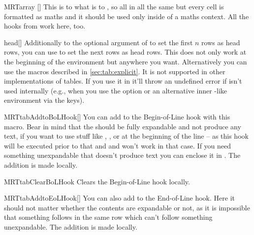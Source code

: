 \begin{describeenv}{MRTarray}%
  []
  This is to  what  is to , so all in
  all the same but every cell is formatted as maths and it should be used only
  inside of a maths context. All the hooks from  work here, too.
\end{describeenv}%

\begin{describemacro}{head}[]%
  Additionally to the optional argument of  to set the first $n$
  rows as head rows, you can use  to set the next  rows as
  head rows. This does not only work at the beginning of the environment but
  anywhere you want. Alternatively you can use the macros described in
  \autoref{sec:tab:explicit}. It is not supported in other implementations of
  tables. If you use it in  it'll throw an undefined error if
   isn't used internally (e.g., when you use the
   option or an alternative inner -like environment via
  the  keys).
\end{describemacro}%

\begin{describemacro}{MRTtabAddtoBoLHook}[]%
  You can add  to the Begin-of-Line hook with this macro. Bear in
  mind that the  should be fully expandable and not produce any
  text, if you want to use stuff like , , or
   at the beginning of the line -- as this hook will be executed prior
  to that and  and  won't work in that case. If you need
  something unexpandable that doesn't produce text you can enclose it in
  . The addition is made locally.
\end{describemacro}%

\begin{describemacro}{MRTtabClearBoLHook}%
  Clears the Begin-of-Line hook locally.
\end{describemacro}%

\begin{describemacro}{MRTtabAddtoEoLHook}[]%
  You can also add  to the End-of-Line hook. Here it should not
  matter whether the contents are expandable or not, as it is impossible that
  something follows in the same row which can't follow something unexpandable.
  The addition is made locally.
\end{describemacro}%

